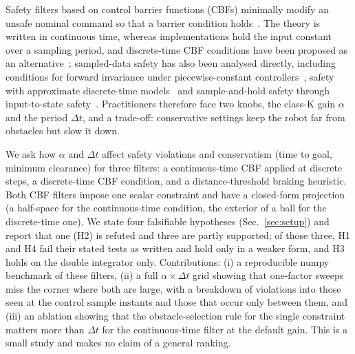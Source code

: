 Safety filters based on control barrier functions (CBFs) minimally modify an unsafe nominal command so that a barrier condition holds~\cite{ames2017control,ames2019control}. The theory is written in continuous time, whereas implementations hold the input constant over a sampling period, and discrete-time CBF conditions have been proposed as an alternative~\cite{zeng2021safety,xiong2023discrete}; sampled-data safety has also been analysed directly, including conditions for forward invariance under piecewise-constant controllers~\cite{breeden2021control}, safety with approximate discrete-time models~\cite{taylor2022safety} and sample-and-hold safety through input-to-state safety~\cite{bahati2023sample}. Practitioners therefore face two knobs, the class-K gain $\alpha$ and the period $\Delta t$, and a trade-off: conservative settings keep the robot far from obstacles but slow it down.

We ask how $\alpha$ and $\Delta t$ affect safety violations and conservatism (time to goal, minimum clearance) for three filters: a continuous-time CBF applied at discrete steps, a discrete-time CBF condition, and a distance-threshold braking heuristic. Both CBF filters impose one scalar constraint and have a closed-form projection (a half-space for the continuous-time condition, the exterior of a ball for the discrete-time one). We state four falsifiable hypotheses (Sec.~\ref{sec:setup}) and report that one (H2) is refuted and three are partly supported; of those three, H1 and H4 fail their stated tests as written and hold only in a weaker form, and H3 holds on the double integrator only. Contributions: (i) a reproducible numpy benchmark of these filters, (ii) a full $\alpha\times\Delta t$ grid showing that one-factor sweeps miss the corner where both are large, with a breakdown of violations into those seen at the control sample instants and those that occur only between them, and (iii) an ablation showing that the obstacle-selection rule for the single constraint matters more than $\Delta t$ for the continuous-time filter at the default gain. This is a small study and makes no claim of a general ranking.
